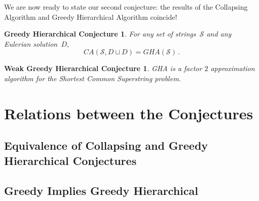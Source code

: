 We are now ready to state our second conjecture: the results of the Collapsing Algorithm and Greedy Hierarchical Algorithm coincide!
\newtheorem*{ghcc}{Greedy Hierarchical Conjecture}
\begin{ghcc}
For any set of strings~$\mathcal{S}$ and any Eulerian solution~$D$,
\[CA(\mathcal{S}, D \sqcup D) = GHA(\mathcal{S}) \, .\]
\end{ghcc}

\newtheorem*{wghcc}{Weak Greedy Hierarchical Conjecture}
\begin{wghcc}
GHA is a factor $2$ approximation algorithm for the Shortest Common Superstring problem.
\end{wghcc}

\section{Relations between the Conjectures}
\subsection{Equivalence of Collapsing and Greedy Hierarchical Conjectures}
\subsection{Greedy Implies Greedy Hierarchical}

